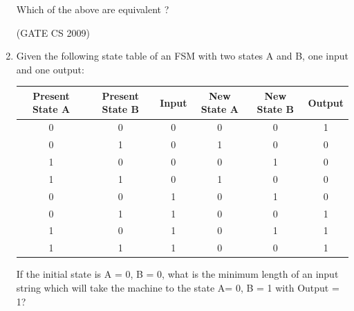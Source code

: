 \documentclass[a4paper, 11pt]{article}
\begin{document}
\begin{enumerate}
    Which of the above are equivalent ?\\

    \begin{enumerate}
    \end{enumerate}

    \hfill (GATE CS 2009)

    \item Given the following state table of an FSM with two states A and B, one input and one output:\\
    \begin{tabular}{|c|c|c|c|c|c|}
    \hline
        Present State A  & Present State B  & Input & New State A & New State B & Output\\
        \hline
        0  & 0  & 0 & 0 & 0 & 1\\
        \hline
        0  & 1  & 0 & 1 & 0 & 0\\
        \hline
        1  & 0  & 0 & 0 & 1 & 0\\
        \hline
        1  & 1  & 0 & 1 & 0 & 0\\
        \hline
        0  & 0  & 1 & 0 & 1 & 0\\
        \hline
        0  & 1  & 1 & 0 & 0 & 1\\
        \hline
        1  & 0  & 1 & 0 & 1 & 1\\
        \hline
        1  & 1  & 1 & 0 & 0 & 1\\
        \hline
    \end{tabular}

        If the initial state is A = 0, B = 0, what is the minimum length of an input string which will take the machine to the state A= 0, B = 1 with Output = 1?\\
        \begin{enumerate}
        \end{enumerate}


\end{enumerate}
\end{document}
